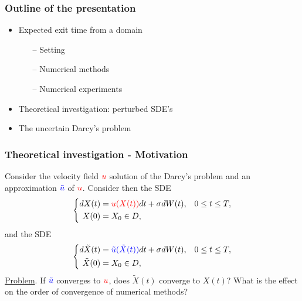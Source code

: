 \begin{frame}
\frametitle{Outline of the presentation}
\begin{itemize}
	\item \color{mygray} Expected exit time from a domain
	\begin{itemize} \color{mygray}
		\item[--] Setting
		\item[--] Numerical methods
		\item[--] Numerical experiments
	\end{itemize} \color{black}
	\item Theoretical investigation: perturbed SDE's 
	\item The uncertain Darcy's problem 
\end{itemize}
\end{frame}

\begin{frame}
\frametitle{Theoretical investigation - Motivation}
Consider the velocity field $\color{red}{u}$ solution of the Darcy's problem and an approximation $\color{blue} \tilde u$ of $\color{red}{u}$. Consider then the SDE
\begin{equation*}
	\left \{
	\begin{aligned}
		dX(t) &= \color{red}{u} (X(t)) \color{black} dt + \sigma dW(t), && 0 \leq t \leq T, \\
		X(0) &= X_0 \in D, \\
	\end{aligned} \right.
\end{equation*}
and the SDE
\begin{equation*}
	\left \{
	\begin{aligned}
		d\tilde X(t) &= \color{blue} \tilde u(\tilde X(t)) \color{black} dt + \sigma dW(t), && 0 \leq t \leq T, \\
		\tilde X(0) &= X_0 \in D, \\
	\end{aligned} \right.
\end{equation*}
\underline{Problem}. If $\color{blue} \tilde u$ converges to $\color{red}{u}$, does $\tilde X(t)$ converge to $X(t)$? What is the effect on the order of convergence of numerical methods?
\end{frame}

